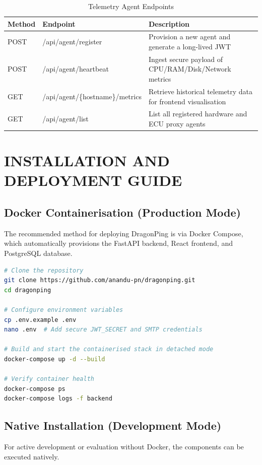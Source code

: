 \documentclass[12pt,a4paper,oneside]{report}
\begin{document}
\begin{table}[H]
\centering
\begin{tabularx}{\textwidth}{|l|l|X|}
\hline
\textbf{Method} & \textbf{Endpoint} & \textbf{Description} \\
\hline
POST & /api/agent/register & Provision a new agent and generate a long-lived JWT \\
\hline
POST & /api/agent/heartbeat & Ingest secure payload of CPU/RAM/Disk/Network metrics \\
\hline
GET & /api/agent/\{hostname\}/metrics & Retrieve historical telemetry data for frontend visualisation \\
\hline
GET & /api/agent/list & List all registered hardware and ECU proxy agents \\
\hline
\end{tabularx}
\caption{Telemetry Agent Endpoints}
\end{table}

\chapter{INSTALLATION AND DEPLOYMENT GUIDE}
\label{app:install}

\section*{Docker Containerisation (Production Mode)}
\noindent The recommended method for deploying DragonPing is via Docker Compose, which automatically provisions the FastAPI backend, React frontend, and PostgreSQL database.

\begin{lstlisting}[language=bash, caption={Docker Deployment commands}, label={lst:docker_deploy}]
# Clone the repository
git clone https://github.com/anandu-pn/dragonping.git
cd dragonping

# Configure environment variables
cp .env.example .env
nano .env  # Add secure JWT_SECRET and SMTP credentials

# Build and start the containerised stack in detached mode
docker-compose up -d --build

# Verify container health
docker-compose ps
docker-compose logs -f backend
\end{lstlisting}

\section*{Native Installation (Development Mode)}
\noindent For active development or evaluation without Docker, the components can be executed natively.
\end{document}
